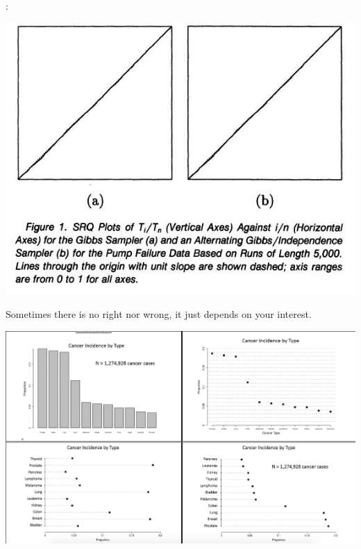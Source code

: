 \begin{frame}[allowframebreaks]{\secname: \subsecname}
	\begin{center}
			\includegraphics[scale=0.5]{images/Example3}
	\end{center}
	
	\framebreak 
	
	Sometimes there is no right nor wrong, it just depends on your interest.
		\begin{center}
				\includegraphics[scale=0.3]{images/Cancer_incidence}
		\end{center}

\end{frame}

